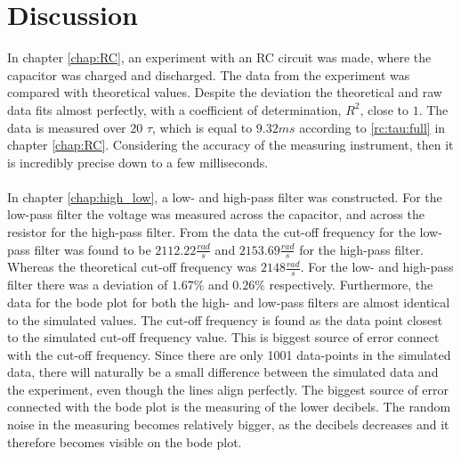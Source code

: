 \chapter{Discussion}
In chapter \ref{chap:RC}, an experiment with an RC circuit was made, where the capacitor was charged and discharged. The data from the experiment was compared with theoretical values. Despite the deviation the theoretical and raw data fits almost perfectly, with a coefficient of determination, $R^2$, close to $1$. The data is measured over 20 $\tau$, which is equal to $9.32 ms$ according to \eqref{rc:tau:full} in chapter \ref{chap:RC}. Considering the accuracy of the measuring instrument, then it is incredibly precise down to a few milliseconds. 
\\ \\
In chapter \ref{chap:high_low}, a low- and high-pass filter was constructed. For the low-pass filter the voltage was measured across the capacitor, and across the resistor for the high-pass filter. From the data the cut-off frequency for the low-pass filter was found to be $2112.22 \frac{rad}{s}$ and $2153.69 \frac{rad}{s}$ for the high-pass filter. Whereas the theoretical cut-off frequency was $2148 \frac{rad}{s}$. For the low- and high-pass filter there was a deviation of $1.67 \% $ and $0.26 \% $ respectively. Furthermore, the data for the bode plot for both the high- and low-pass filters are almost identical to the simulated values. The cut-off frequency is found as the data point closest to the simulated cut-off frequency value. This is biggest source of error connect with the cut-off frequency. Since there are only 1001 data-points in the simulated data, there will naturally be a small difference between the simulated data and the experiment, even though the lines align perfectly. The biggest source of error connected with the bode plot is the measuring of the lower decibels. The random noise in the measuring becomes relatively bigger, as the decibels decreases and it therefore becomes visible on the bode plot.